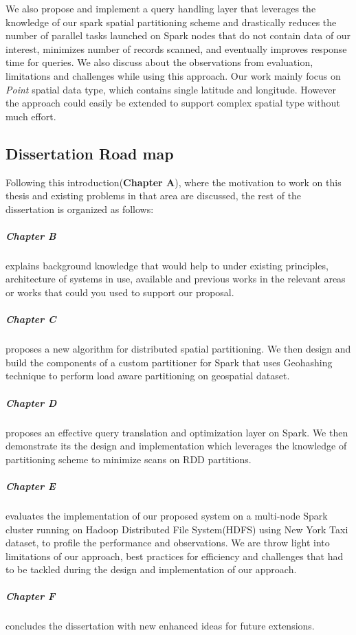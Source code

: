 \documentclass[article,type=msc,colorback,12pt,accentcolor=tud1d]{tudthesis}
\begin{document}
		We also propose and implement a query handling layer that leverages the knowledge of our spark spatial partitioning scheme and drastically reduces the number of parallel tasks launched on Spark nodes that do not contain data of our interest, minimizes number of records scanned, and eventually improves response time for queries. We also discuss about the observations from evaluation, limitations and challenges while using this approach. Our work mainly focus on \textit{Point} spatial data type, which contains single latitude and longitude. However the approach could easily be extended to support complex spatial type without much effort.
		
		\hfill
		\subsection{Dissertation Road map}
		
		Following this introduction(\textbf{Chapter A}), where the motivation to work on this thesis and existing problems in that area are discussed, the rest of the dissertation is organized as follows: 
		
		\subparagraph{Chapter B} explains background knowledge that would help to under existing principles, architecture of systems in use, available and previous works in the relevant areas or works that could you used to support our proposal.  
		
		\subparagraph{Chapter C} proposes a new algorithm for distributed spatial partitioning. We then design and build the components of a custom partitioner for Spark that uses Geohashing technique to perform load aware partitioning on geospatial dataset. 
		
		\subparagraph{Chapter D} proposes an effective query translation and optimization layer on Spark. We then demonstrate its the design and implementation which leverages the knowledge of partitioning scheme to minimize scans on RDD partitions. 
		
		\subparagraph{Chapter E} evaluates the implementation of our proposed system on a multi-node Spark cluster running on Hadoop Distributed File System(HDFS) using New York Taxi dataset, to profile the performance and observations. We are throw light into limitations of our approach, best practices for efficiency and challenges that had to be tackled during the design and implementation of our approach. 
		
		\subparagraph{Chapter F} concludes the dissertation with new enhanced ideas for future extensions. 
\end{document}
